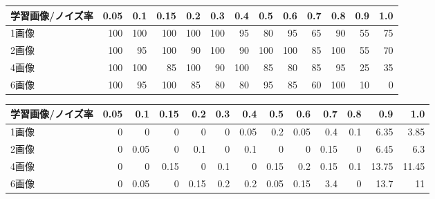 \documentclass{ltjsarticle}
\begin{document}
\begin{center}
  \begin{tabular}{|l|r|r|r|r|r|r|r|r|r|r|r|r|} \hline
    学習画像/ノイズ率 & 0.05 & 0.1 & 0.15 & 0.2 & 0.3 & 0.4 & 0.5 & 0.6 & 0.7 & 0.8 & 0.9 & 1.0 \\ \hline
    1画像 & 100 & 100 & 100 & 100 & 100 & 95 & 80 & 95 & 65 & 90 & 55 & 75 \\
    2画像 & 100 & 95 & 100 & 90 & 100 & 90 & 100 & 100 & 85 & 100 & 55 & 70 \\
    4画像 & 100  & 100 & 85 & 100 & 90 & 100 & 85 & 80 & 85 & 95 & 25 & 35 \\
    6画像 & 100 & 95 & 100 & 85 & 80 & 80 & 95 & 85 & 60 & 100 & 10 & 0 \\ \hline
  \end{tabular}
  \begin{tabular}{|l|r|r|r|r|r|r|r|r|r|r|r|r|} \hline
    学習画像/ノイズ率 & 0.05 & 0.1 & 0.15 & 0.2 & 0.3 & 0.4 & 0.5 & 0.6 & 0.7 & 0.8 & 0.9 & 1.0 \\ \hline
    1画像 & 0 & 0 & 0 & 0 & 0 & 0.05 & 0.2 & 0.05 & 0.4 & 0.1 & 6.35 & 3.85 \\
    2画像 & 0 & 0.05 & 0 & 0.1 & 0 & 0.1 & 0 & 0 & 0.15 & 0 & 6.45 & 6.3 \\
    4画像 & 0  & 0 & 0.15 & 0 & 0.1 & 0 & 0.15 & 0.2 & 0.15 & 0.1 & 13.75 & 11.45 \\
    6画像 & 0 & 0.05 & 0 & 0.15 & 0.2 & 0.2 & 0.05 & 0.15 & 3.4 & 0 & 13.7 & 11 \\ \hline
  \end{tabular}
\end{center}
\end{document}

